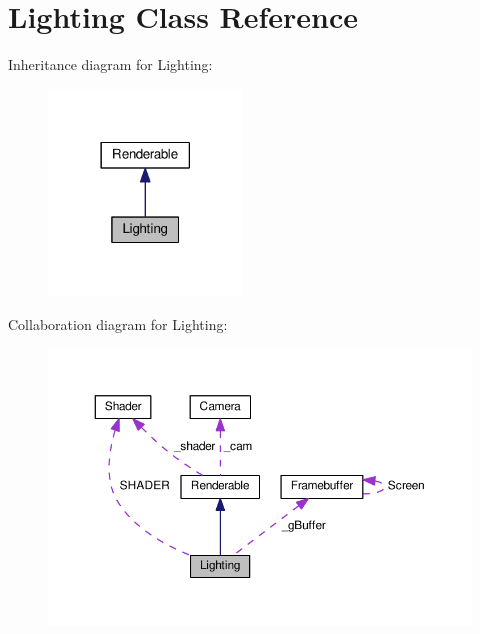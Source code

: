 \hypertarget{class_lighting}{}\section{Lighting Class Reference}
\label{class_lighting}


Inheritance diagram for Lighting\+:\nopagebreak
\begin{figure}[H]
\begin{center}
\leavevmode
\includegraphics[width=146pt]{class_lighting__inherit__graph}
\end{center}
\end{figure}


Collaboration diagram for Lighting\+:\nopagebreak
\begin{figure}[H]
\begin{center}
\leavevmode
\includegraphics[width=350pt]{class_lighting__coll__graph}
\end{center}
\end{figure}
